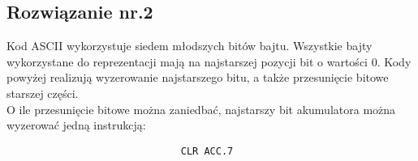 \documentclass[a4paper,12pt]{extarticle}  %
\begin{document}
\subsection{Rozwiązanie nr.2}
Kod ASCII wykorzystuje siedem młodszych bitów bajtu.
Wszystkie bajty wykorzystane do reprezentacji mają na najstarszej pozycji bit o wartości 0.
Kody powyżej realizują wyzerowanie najstarszego bitu, a także przesunięcie bitowe starszej części.\\
O ile przesunięcie bitowe można zaniedbać, najstarszy bit akumulatora można wyzerować jedną instrukcją:
\begin{lstlisting}
                              CLR ACC.7
\end{lstlisting}
\end{document}
